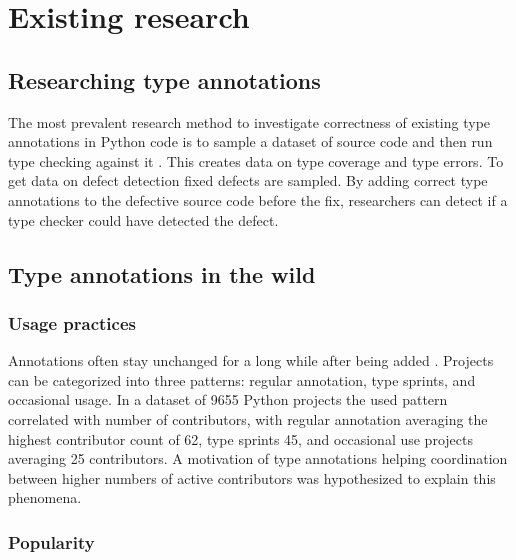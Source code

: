 \chapter{Existing research\label{related_work}}
\section{Researching type annotations}

The most prevalent research method to investigate correctness of existing type annotations in Python code is to sample a dataset of source code and then run type checking against it \cite{di_grazia_evolution_2022, lin_towards_large_scale_2023, rak-amnouykit_taleoftwo_2020, xu_how_well_static_2023}. This creates data on type coverage and type errors. To get data on defect detection fixed defects are sampled. By adding correct type annotations to the defective source code before the fix, researchers can detect if a type checker could have detected the defect.




\section{Type annotations in the wild}

\subsection{Usage practices}

Annotations often stay unchanged for a long while after being added \cite{di_grazia_evolution_2022}. Projects can be categorized into three patterns: regular annotation, type sprints, and occasional usage. In a dataset of 9655 Python projects the used pattern correlated with number of contributors, with regular annotation averaging the highest contributor count of 62, type sprints 45, and occasional use projects averaging 25 contributors. A motivation of type annotations helping coordination between higher numbers of active contributors was hypothesized to explain this phenomena.

\subsection{Popularity}

